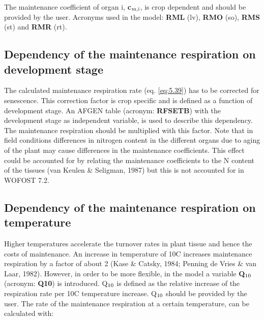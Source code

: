 The maintenance coefficient of organ i, {\bf c$_{{\rm m,i}}$}, is crop dependent and should be provided by
the user. Acronyms used in the model: {\bf RML} (lv), {\bf RMO} (so), {\bf RMS} (st) and {\bf RMR} (rt).


\subsection{Dependency of the maintenance respiration on development stage}
The calculated maintenance respiration rate (eq. \ref{eq:5.39}) has to be corrected for senescence.
This correction factor is crop specific and is defined as a function of development stage. 
An AFGEN table (acronym: {\bf RFSETB}) with the development stage as
independent variable, is used to describe this dependency. The maintenance respiration
should be multiplied with this factor.  Note that in field conditions differences in nitrogen 
content in the different organs due to aging of the plant may cause differences in the maintenance coefficients. This effect could be accounted for by relating 
the maintenance coefficients to the N content of the tissues (van Keulen \& Seligman, 1987)
but this is not accounted for in WOFOST 7.2.


\subsection{Dependency of the maintenance respiration on temperature}
Higher temperatures accelerate the turnover rates in plant tissue and hence the costs of
maintenance. An increase in temperature of 10\textdegree C increases maintenance respiration by a
factor of about 2 (Kase \& Catsky, 1984; Penning de Vries \& van Laar, 1982). However,
in order to be more flexible, in the model a variable {\bf Q$_{{\rm 10}}$} (acronym: {\bf Q10}) is introduced.
Q$_{{\rm 10}}$ is defined as the relative increase of the respiration rate per 10\degrees C temperature
increase. Q$_{{\rm 10}}$ should be provided by the user. The rate of the maintenance respiration at a
certain temperature, can be calculated with:

